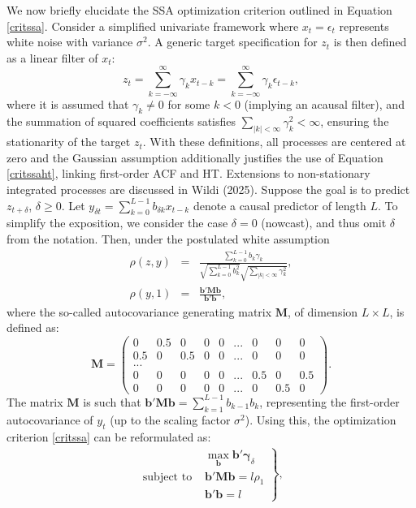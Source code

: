 \documentclass[11pt,a4paper]{article}
\begin{document}
We now briefly elucidate the SSA optimization criterion outlined in Equation \ref{critssa}. Consider a simplified univariate framework where $x_t=\epsilon_t$ represents white noise with variance $\sigma^2$. A generic target specification for $z_t$ is then defined as a linear filter of $x_t$:
\[z_t=\sum_{k=-\infty}^\infty \gamma_k x_{t-k}=\sum_{k=-\infty}^\infty \gamma_k \epsilon_{t-k},\] 
where it is assumed that $\gamma_k\neq 0$ for some $k<0$ (implying an acausal filter), and the summation of squared coefficients satisfies $\sum_{|k|<\infty}\gamma_k^2<\infty$, ensuring the stationarity of the target $z_t$. With these definitions, all processes are centered at zero and the Gaussian assumption additionally justifies the use of Equation \ref{critssaht}, linking first-order ACF and HT. Extensions to non-stationary integrated processes are discussed in Wildi (2025). Suppose the goal is to predict  $z_{t+\delta}$, $\delta\geq 0$. Let  $y_{\delta t}=\sum_{k=0}^{L-1} b_{\delta k}x_{t-k}$  denote a causal predictor of length $L$.  To simplify the exposition, we consider the case $\delta=0$ (nowcast), and thus omit $\delta$ from the notation. Then, under the postulated white assumption
\begin{eqnarray*}
\rho(z,y)&=&\frac{\sum_{k=0}^{L-1}b_k\gamma_k}{\sqrt{\sum_{k=0}^{L-1}b_k^2}\sqrt{\sum_{|k|<\infty}\gamma_k^2}},\\
\rho(y,1)&=&\frac{\mathbf{b}'\mathbf{Mb}}{\mathbf{b}'\mathbf{b}},
\end{eqnarray*} 
where the so-called autocovariance generating matrix $\mathbf{M}$, of dimension $L\times L$, is defined as:
\[
\mathbf{M}=\left(\begin{array}{ccccccccc}0&0.5&0&0&0&...&0&0&0\\
0.5&0&0.5&0&0&...&0&0&0\\
...&&&&&&&&\\
0&0&0&0&0&...&0.5&0&0.5\\
0&0&0&0&0&...&0&0.5&0
\end{array}\right).
\]
The matrix $\mathbf{M}$ is such that $\mathbf{b}'\mathbf{Mb}=\sum_{k=1}^{L-1}b_{k-1}b_k$, representing the first-order autocovariance of $y_t$ (up to the scaling factor $\sigma^2$).  Using this, the optimization criterion \ref{critssa} can be reformulated as:
\begin{eqnarray}\label{crit1}
\left.\begin{array}{cc}
&\max_{\mathbf{b}}\mathbf{b}'\boldsymbol{\gamma}_{\delta}\\
\textrm{subject~to~}&\mathbf{b}'\mathbf{Mb}=l\rho_1\\
&\mathbf{b}'\mathbf{b}=l
\end{array}\right\},
\end{eqnarray}
\end{document}
